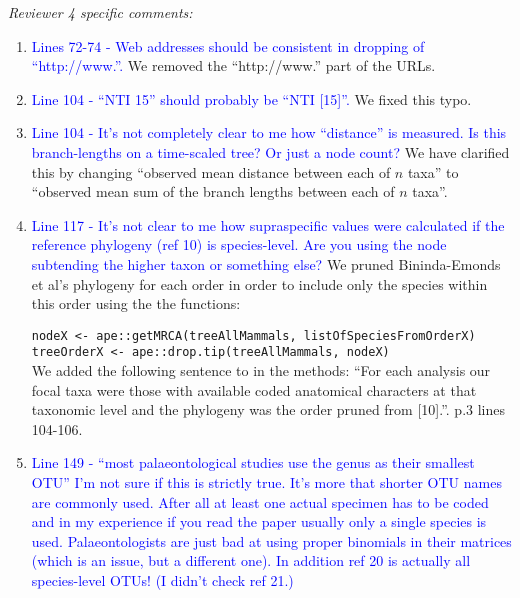 \documentclass[12pt,letterpaper]{article}
\renewcommand{\subsection}[1]{%
\bigskip
\begin{center}
\begin{large}
\normalfont\itshape #1
\end{large}
\end{center}}
\begin{document}
\subsection{Reviewer 4 specific comments:}
\begin{enumerate}
\item{\textcolor{blue}{Lines 72-74 - Web addresses should be consistent in dropping of ``http://www.''.}}
We removed the ``http://www.'' part of the URLs.

\item{\textcolor{blue}{Line 104 - ``NTI 15'' should probably be ``NTI [15]''.}}
We fixed this typo.

\item{\textcolor{blue}{Line 104 - It's not completely clear to me how ``distance'' is measured. Is this branch-lengths on a time-scaled tree? Or just a node count?}}
We have clarified this by changing ``observed mean distance between each of $n$ taxa'' to ``observed mean sum of the branch lengths between each of $n$ taxa''.

\item{\textcolor{blue}{Line 117 - It's not clear to me how supraspecific values were calculated if the reference phylogeny (ref 10) is species-level. Are you using the node subtending the higher taxon or something else?}}
We pruned Bininda-Emonds et al's phylogeny for each order in order to include only the species within this order using the the functions:

\texttt{nodeX <- ape::getMRCA(treeAllMammals, listOfSpeciesFromOrderX)}\\
\texttt{treeOrderX <- ape::drop.tip(treeAllMammals, nodeX)}\\

We added the following sentence to in the methods:
``For each analysis our focal taxa were those with available coded anatomical characters at that taxonomic level and the phylogeny was the order pruned from [10].''. p.3 lines 104-106.


\item{\textcolor{blue}{Line 149 - ``most palaeontological studies use the genus as their smallest OTU'' I'm not sure if this is strictly true. It's more that shorter OTU names are commonly used. After all at least one actual specimen has to be coded and in my experience if you read the paper usually only a single species is used. Palaeontologists are just bad at using proper binomials in their matrices (which is an issue, but a different one). In addition ref 20 is actually all species-level OTUs! (I didn't check ref 21.)}}


\end{enumerate}
\end{document}
